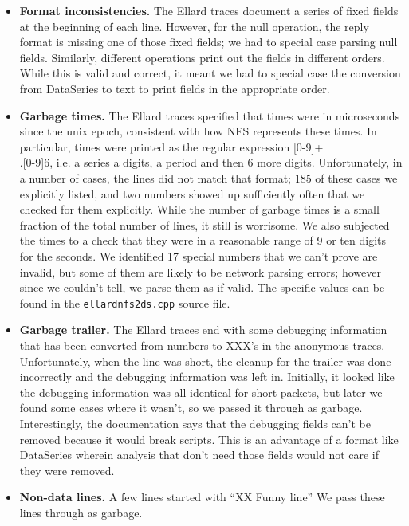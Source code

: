 \begin{itemize}
\item {\bf Format inconsistencies.} The Ellard traces document a
series of fixed fields at the beginning of each line.  However, for
the null operation, the reply format is missing one of those fixed
fields; we had to special case parsing null fields.  Similarly,
different operations print out the fields in different orders.  While
this is valid and correct, it meant we had to special case the
conversion from DataSeries to text to print fields in the appropriate
order.

\item {\bf Garbage times.} The Ellard traces specified that times were
in microseconds since the unix epoch, consistent with how NFS
represents these times.  In particular, times were printed as the
regular expression [0-9]+\\.[0-9]{6}, i.e. a series a digits, a period
and then 6 more digits.  Unfortunately, in a number of cases, the
lines did not match that format; 185 of these cases we explicitly
listed, and two numbers showed up sufficiently often that we checked
for them explicitly.  While the number of garbage times is a small
fraction of the total number of lines, it still is worrisome.  We also
subjected the times to a check that they were in a reasonable range of
9 or ten digits for the seconds.  We identified 17 special numbers
that we can't prove are invalid, but some of them are likely to be
network parsing errors; however since we couldn't tell, we parse them
as if valid.  The specific values can be found in the
\texttt{ellardnfs2ds.cpp} source file.

\item {\bf Garbage trailer.}  The Ellard traces end with some
debugging information that has been converted from numbers to XXX's in
the anonymous traces.  Unfortunately, when the line was short, the
cleanup for the trailer was done incorrectly and the debugging
information was left in.  Initially, it looked like the debugging
information was all identical for short packets, but later we found
some cases where it wasn't, so we passed it through as garbage.
Interestingly, the documentation says that the debugging fields can't
be removed because it would break scripts.  This is an advantage of a
format like DataSeries wherein analysis that don't need those fields
would not care if they were removed.

\item {\bf Non-data lines.}  A few lines started with ``XX Funny
line'' We pass these lines through as garbage.


\end{itemize}

